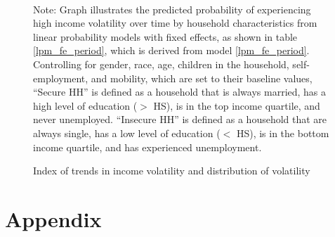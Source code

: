 \documentclass[12pt]{article}
\begin{document}
\begin{figure}[htp!]
    \centering
    \caption{Index of trends in income volatility and distribution of volatility}
    \label{pr_high_vol_groups}
    \\
    \raggedright{\footnotesize{Note: Graph illustrates the predicted probability of experiencing high income volatility over time by household characteristics from linear probability models with fixed effects, as shown in table \ref{lpm_fe_period}, which is derived from model \ref{lpm_fe_period}.  Controlling for gender, race, age, children in the household, self-employment, and mobility, which are set to their baseline values, ``Secure HH'' is defined as a household that is always married, has a high level of education ($>$ HS), is in the top income quartile, and never unemployed.  ``Insecure HH'' is defined as a household that are always single, has a low level of education ($<$ HS), is in the bottom income quartile, and has experienced unemployment.}}
\end{figure}


\clearpage

\appendix
\setcounter{table}{0}
\setcounter{figure}{0}
\renewcommand*\thetable{\Alph{section}.\arabic{table}}
\renewcommand*\thefigure{\Alph{section}.\arabic{figure}}
\section{Appendix}
\label{appendix_a}
\end{document}
